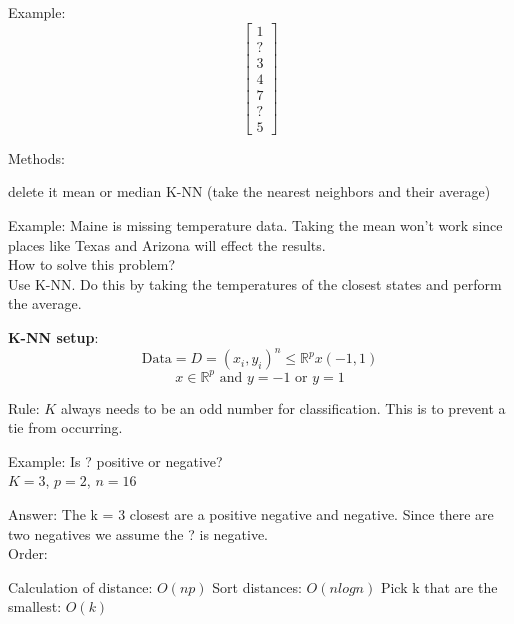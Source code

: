 Example:
\[
    \begin{bmatrix}
        1 \\
        ? \\
        3 \\
        4 \\
        7 \\
        ? \\
        5
    \end{bmatrix}
\] 

Methods:
\begin{outline}[enumerate]
    \1 delete it 
    \1 mean or median 
    \1 K-NN (take the nearest neighbors and their average)
\end{outline}

Example: Maine is missing temperature data. Taking the mean won't work since places like Texas and Arizona will effect the results. \\

How to solve this problem? \\
Use K-NN. Do this by taking the temperatures of the closest states and perform the average. 

\textbf{K-NN setup}: 
\[
    \textrm{Data} = D ={(x_i,y_i)}^n \leq \mathbb{R}^px(-1,1)
\]
\[
    x\in \mathbb{R}^p \textrm{ and } y=-1 \textrm{ or } y=1
\]

Rule:
$K$ always needs to be an odd number for classification. This is to prevent a tie from occurring.

Example: Is ? positive or negative? \\
$K = 3$, $p = 2$, $n = 16$


Answer: The k = 3 closest are a positive negative and negative. Since there are two negatives we assume the ? is negative. \\

Order:
\begin{outline}
    \1 Calculation of distance: $O(np)$
    \1 Sort distances: $O(n log n)$
    \1 Pick k that are the smallest: $O(k)$
\end{outline}

